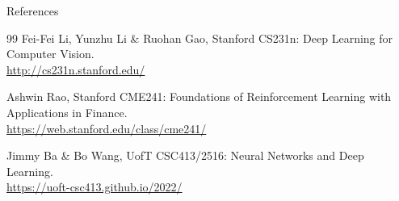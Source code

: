 \begin{frame}[allowframebreaks]{References}
\begin{thebibliography}{99}
Fei-Fei Li, Yunzhu Li \& Ruohan Gao, Stanford CS231n: Deep Learning for Computer Vision.\\
\url{http://cs231n.stanford.edu/}

Ashwin Rao, Stanford CME241: Foundations of Reinforcement Learning with Applications in Finance.\\
\url{https://web.stanford.edu/class/cme241/}

Jimmy Ba \& Bo Wang, UofT CSC413/2516: Neural Networks and Deep Learning.\\
\url{https://uoft-csc413.github.io/2022/}

\end{thebibliography}
\end{frame}
